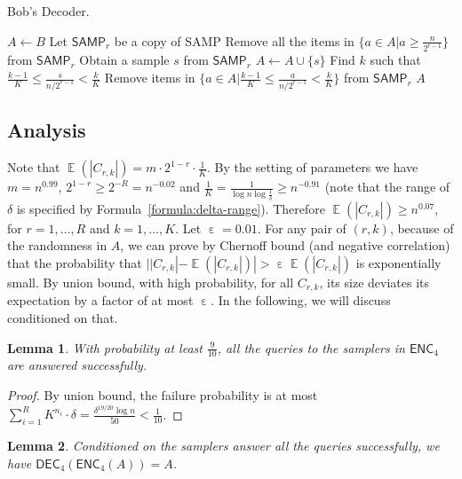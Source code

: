 \documentclass[10pt]{article}
\DeclareMathOperator*{\E}{\mathbb{E}}
\DeclareMathOperator*{\eps}{\varepsilon}
\newtheorem{lemma}{Lemma}
\newcommand{\samp}{\textsf{SAMP}\xspace}
\newcommand{\enc}{\textsf{ENC}\xspace}
\newcommand{\dec}{\textsf{DEC}\xspace}
\begin{document}
\begin{algorithm}[H]
  \caption{Bob's Decoder.}
  \begin{algorithmic}[1]
    \Procedure{$\dec_4$}{\samp, $B$}
    \State $A\leftarrow B$
      \State Let $\samp_r$ be a copy of \samp 
      \State Remove all the items in $\{a\in A|a\ge \frac{n}{2^{r-1}}\}$ from $\samp_r$
      \State Obtain a sample $s$ from $\samp_r$
      \State $A\leftarrow A \cup \{s\}$
      \State Find $k$ such that $\frac{k-1}{K} \le \frac{s}{n/2^{r-1}} < \frac{k}{K}$
      \State Remove items in $\{a\in A|\frac{k-1}{K} \le \frac{a}{n/2^{r-1}} < \frac{k}{K} \}$ from $\samp_r$
      \EndFor
    \EndFor
    \State \Return $A$ 
    \EndProcedure
  \end{algorithmic}
\end{algorithm}

\subsection{Analysis} 

Note that $\E(|C_{r,k}|)=m\cdot 2^{1-r}\cdot \frac{1}{K}$. By the setting of parameters we have $m=n^{0.99}$, $2^{1-r}\ge 2^{-R}=n^{-0.02}$ and $\frac{1}{K}=\frac{1}{\log n \log \frac{1}{\delta}}\ge n^{-0.91}$ (note that the range of $\delta$ is specified by Formula~\ref{formula:delta-range}). Therefore $\E(|C_{r,k}|) \ge n^{0.07}$, for $r=1,\ldots, R$ and $k=1,\ldots, K$. Let $\eps=0.01$. For any pair of $(r,k)$, because of the randomness in $A$, we can prove by Chernoff bound (and negative correlation) that the probability that $||C_{r,k}|-\E(|C_{r,k}|)|>\eps \E(|C_{r,k}|)$ is exponentially small. By union bound, with high probability, for all $C_{r,k}$, its size deviates its expectation by a factor of at most $\eps$. In the following, we will discuss conditioned on that.

\begin{lemma} \label{lemma:enc_4-sampler-work}
  With probability at least $\frac{9}{10}$, all the queries to the samplers in $\enc_4$ are answered successfully. 
\end{lemma}

\begin{proof}
  By union bound, the failure probability is at most $\sum_{i=1}^{R} K^{n_i}\cdot \delta = \frac{\delta^{19/20} \log n}{50} < \frac{1}{10}$. 
\end{proof}

\begin{lemma}
  Conditioned on the samplers answer all the queries successfully, we have $\dec_4(\enc_4(A))=A$.
\end{lemma}
\end{document}
